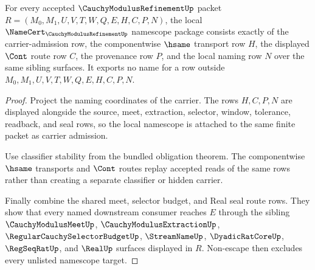 \begin{theorem}
\label{thm:cauchy-modulus-refinement-namescope-package}
For every accepted $\CauchyModulusRefinementUp$ packet $R=(M_0,M_1,U,V,T,W,Q,E,H,C,P,N)$, the local $\NameCert_{\CauchyModulusRefinementUp}$ namescope package consists exactly of the carrier-admission row, the componentwise $\hsame$ transport row $H$, the displayed $\Cont$ route row $C$, the provenance row $P$, and the local naming row $N$ over the same sibling surfaces. It exports no name for a row outside $M_0,M_1,U,V,T,W,Q,E,H,C,P,N$.
\end{theorem}
\begin{proof}
Project the naming coordinates of the carrier. The rows $H,C,P,N$ are displayed alongside the source, meet, extraction, selector, window, tolerance, readback, and seal rows, so the local namescope is attached to the same finite packet as carrier admission.

Use classifier stability from the bundled obligation theorem. The componentwise $\hsame$ transports and $\Cont$ routes replay accepted reads of the same rows rather than creating a separate classifier or hidden carrier.

Finally combine the shared meet, selector budget, and Real seal route rows. They show that every named downstream consumer reaches $E$ through the sibling $\CauchyModulusMeetUp$, $\CauchyModulusExtractionUp$, $\RegularCauchySelectorBudgetUp$, $\StreamNameUp$, $\DyadicRatCoreUp$, $\RegSeqRatUp$, and $\RealUp$ surfaces displayed in $R$. Non-escape then excludes every unlisted namescope target.
\end{proof}

